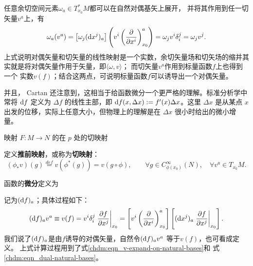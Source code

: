 任意余切空间元素$\omega_a \in T_{x_0}^{*}M$都可以在自然对偶基矢上展开，
并将其作用到任一切矢量$v^a$上，有
\begin{equation}
    \omega_a (v^a) = \left[\omega_j({\rm d}x^j)_a\right] 
      \left(v^i \left(\frac{\partial }{\partial x^i}\right)^a_{x_0}\right) = 
     \omega_j v^i \delta^j_i = \omega_j v^j .
\end{equation}
上式说明对偶矢量和切矢量的线性映射是一个实数，余切矢量场和切矢场的缩并其实就是将对偶矢量作用于矢量，即$\langle \omega, v\rangle$；
而切矢量$v^a$作用到标量函数$f$上也得到一个
实数$v(f)$；结合这两点，可说明标量函数$f$可以诱导出一个对偶矢量。

并且，
Cartan 还注意到，这相当于给函数微分一个更严格的理解。标准分析学中常将 $\dd f$ 定义为 $\Delta f$ 的线性主部，即 $\dd f(x,\Delta x):=f'(x)\Delta x$。这里 $\Delta x$ 是从某点 $x$ 出发的位移，实际上任意大小，但物理上的理解是在 $\Delta x$ 很小时给出的微小增量。

\begin{definition}
    映射 $F:M\to N$ 的在 $p$ 处的切映射
\end{definition}

\begin{definition}\label{chdm:def_pushforward-vector}
    定义\textbf{推前映射}，或称为\textbf{切映射}：
    \begin{equation}
        (\phi_{*}v)(g) \overset{def}{=} v(\phi^{*}(g)) = v (g \circ \phi), 
        \qquad \forall g\in C^\infty_{\phi(x_0)}(N),\quad \forall v^a \in T_{x_0}M .
    \end{equation}
\end{definition}

\begin{definition}函数的\textbf{微分}定义为
\end{definition}

记为$({\rm d}f)_a$；具体过程如下：
\begin{equation}\label{chdm:eqn_dfv}
    ({\rm d}f)_a v^a \equiv v(f)  %
    = v^i  \delta_i^j  \left.\frac{\partial f}{\partial x^j}\right|_{x_0}
    = \left[v^i  \left(\frac{\partial }{\partial x^i}\right)^a_{x_0}\right] \left[
      ({\rm d}x^j)_a  \left.\frac{\partial f}{\partial x^j}\right|_{x_0} \right] .
\end{equation}
我们说了$({\rm d}f)_a$是由$f$诱导的对偶矢量，自然令$({\rm d}f)_a v^a$ 等于$v(f)$，也可看成定义。
上式计算过程用到了式\eqref{chdm:eqn_v-expand-on-natural-bases}和
式\eqref{chdm:eqn_dual-natural-bases}。

